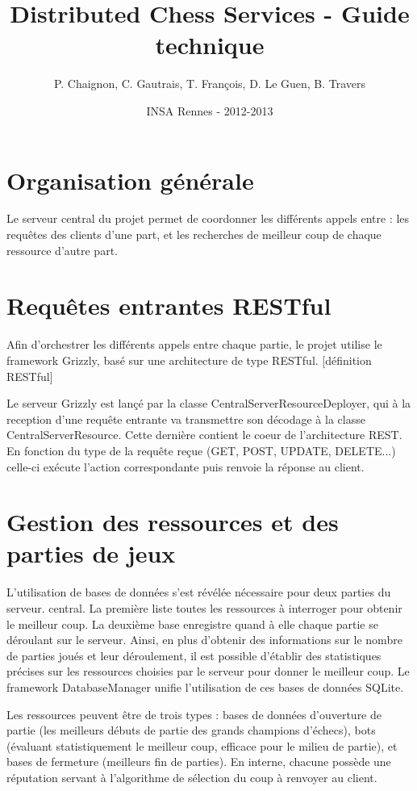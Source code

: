 \documentclass[a4paper,11pt]{article}
\title{Distributed Chess Services - Guide technique}
\author{P. Chaignon, C. Gautrais, T. François, D. Le Guen, B. Travers}
\date{INSA Rennes - 2012-2013}
\begin{document}
\maketitle{}

\section{Organisation générale}

    Le serveur central du projet permet de coordonner les différents appels entre : les requêtes des clients d'une part, et les recherches de meilleur coup de chaque ressource d'autre part.

\section{Requêtes entrantes RESTful}
    Afin d'orchestrer les différents appels entre chaque partie, le projet utilise le framework Grizzly, basé sur une architecture de type RESTful. [définition RESTful]
    
    Le serveur Grizzly est lançé par la classe CentralServerResourceDeployer, qui à la reception d'une requête entrante va transmettre son décodage à la classe CentralServerResource. Cette dernière contient le coeur de l'architecture REST. En fonction du type de la requête reçue (GET, POST, UPDATE, DELETE...) celle-ci exécute l'action correspondante puis renvoie la réponse au client.

\section{Gestion des ressources et des parties de jeux}

    L'utilisation de bases de données s'est révélée nécessaire pour deux parties du serveur. central. La première liste toutes les ressources à interroger pour obtenir le meilleur coup. La deuxième base enregistre quand à elle chaque partie se déroulant sur le serveur. Ainsi, en plus d'obtenir des informations sur le nombre de parties joués et leur déroulement, il est possible d'établir des statistiques précises sur les ressources choisies par le serveur pour donner le meilleur coup. Le framework DatabaseManager unifie l'utilisation de ces bases de données SQLite.

	

    Les ressources peuvent être de trois types : bases de données d'ouverture de partie (les meilleurs débuts de partie des grands champions d'échecs), bots (évaluant statistiquement le meilleur coup, efficace pour le milieu de partie), et bases de fermeture (meilleurs fin de parties). En interne, chacune possède une réputation servant à l'algorithme de sélection du coup à renvoyer au client.
\end{document}
